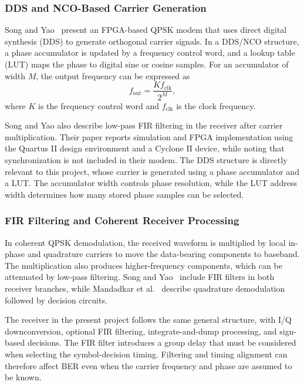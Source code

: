 \documentclass[10pt,twocolumn,letterpaper]{article}
\begin{document}
\subsubsection{DDS and NCO-Based Carrier Generation}
Song and Yao~\cite{song2010qpsk} present an FPGA-based QPSK modem that uses direct digital synthesis (DDS) to generate orthogonal carrier signals. In a DDS/NCO structure, a phase accumulator is updated by a frequency control word, and a lookup table (LUT) maps the phase to digital sine or cosine samples. For an accumulator of width $M$, the output frequency can be expressed as
\begin{equation}
 f_{\mathrm{out}}=\frac{K f_{\mathrm{clk}}}{2^M},
 \label{eq:dds_frequency}
\end{equation}
where $K$ is the frequency control word and $f_{\mathrm{clk}}$ is the clock frequency.

Song and Yao also describe low-pass FIR filtering in the receiver after carrier multiplication. Their paper reports simulation and FPGA implementation using the Quartus II design environment and a Cyclone II device, while noting that synchronization is not included in their modem. The DDS structure is directly relevant to this project, whose carrier is generated using a phase accumulator and a LUT. The accumulator width controls phase resolution, while the LUT address width determines how many stored phase samples can be selected.

\subsubsection{FIR Filtering and Coherent Receiver Processing}
In coherent QPSK demodulation, the received waveform is multiplied by local in-phase and quadrature carriers to move the data-bearing components to baseband. The multiplication also produces higher-frequency components, which can be attenuated by low-pass filtering. Song and Yao~\cite{song2010qpsk} include FIR filters in both receiver branches, while Mandadkar et al.~\cite{mandadkar2014qpsk} describe quadrature demodulation followed by decision circuits.

The receiver in the present project follows the same general structure, with I/Q downconversion, optional FIR filtering, integrate-and-dump processing, and sign-based decisions. The FIR filter introduces a group delay that must be considered when selecting the symbol-decision timing. Filtering and timing alignment can therefore affect BER even when the carrier frequency and phase are assumed to be known.
\end{document}
